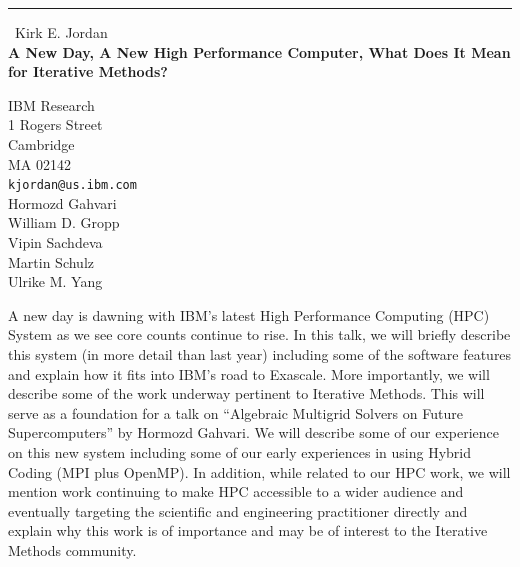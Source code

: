 \documentclass{report}
\begin{document}
\begin{center}
\rule{6in}{1pt} \
{\large Kirk E. Jordan \\
{\bf A New Day, A New High Performance Computer, What Does It Mean for Iterative Methods?}}

IBM Research \\ 1 Rogers Street \\ Cambridge \\ MA 02142
\\
{\tt kjordan@us.ibm.com}\\
Hormozd Gahvari\\
William D. Gropp \\
Vipin Sachdeva\\
Martin Schulz\\
Ulrike M. Yang\end{center}

A new day is dawning with IBM’s latest High Performance Computing (HPC)
System as we see core counts continue to rise. In this talk, we will
briefly describe this system (in more detail than last year) including
some of the software features and explain how it fits into IBM’s road
to Exascale. More importantly, we will describe some of the work underway
pertinent to Iterative Methods. This will serve as a foundation for a
talk on “Algebraic Multigrid Solvers on Future Supercomputers” by
Hormozd Gahvari. We will describe some of our experience on this new
system including some of our early experiences in using Hybrid Coding
(MPI plus OpenMP). In addition, while related to our HPC work, we will
mention work continuing to make HPC accessible to a wider audience and
eventually targeting the scientific and engineering practitioner directly
and explain why this work is of importance and may be of interest to the
Iterative Methods community.
\end{document}

